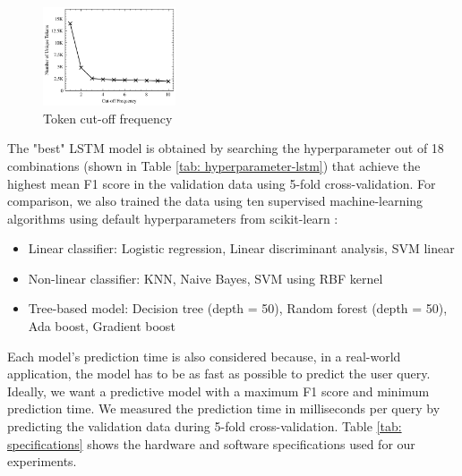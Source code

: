\begin{figure} [ht]
  \centering
  \includegraphics[width=0.35\textwidth]{image/eda_lineplot_token_cutoff_freq.png}

  \caption{Token cut-off frequency}
  \label{fig:eda_lineplot_token_cutoff_freq.png}
\end{figure}

\par The "best" LSTM model is obtained by searching the hyperparameter out of 18 combinations (shown in Table \ref{tab: hyperparameter-lstm}) that achieve the highest mean F1 score in the validation data using 5-fold cross-validation. For comparison, we also trained the data using ten supervised machine-learning algorithms using default hyperparameters from scikit-learn \cite{scikit-learn}:
\begin{itemize}[
    \setlength{\IEEElabelindent}{\dimexpr-\labelwidth-\labelsep}%
    \setlength{\itemindent}{\dimexpr\labelwidth+\labelsep}%
    \setlength{\listparindent}{\parindent}%
  ]
  \item Linear classifier: Logistic regression, Linear discriminant analysis, SVM linear
  \item Non-linear classifier: KNN, Naive Bayes, SVM using RBF kernel
  \item Tree-based model: Decision tree (depth = 50), Random forest (depth = 50), Ada boost, Gradient boost
\end{itemize}

\par Each model's prediction time is also considered because, in a real-world application, the model has to be as fast as possible to predict the user query. Ideally, we want a predictive model with a maximum F1 score and minimum prediction time. We measured the prediction time in milliseconds per query by predicting the validation data during 5-fold cross-validation. Table \ref{tab: specifications} shows the hardware and software specifications used for our experiments.

